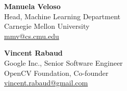 \textbf{Manuela Veloso}\\
Head, Machine Learning Department\\
Carnegie Mellon University\\
\href{mailto:mmv@cs.cmu.edu}{mmv@cs.cmu.edu}

\textbf{Vincent Rabaud}\\
Google Inc., Senior Software Engineer\\
OpenCV Foundation, Co-founder\\
\href{mailto:vincent.rabaud@gmail.com}{vincent.rabaud@gmail.com}


